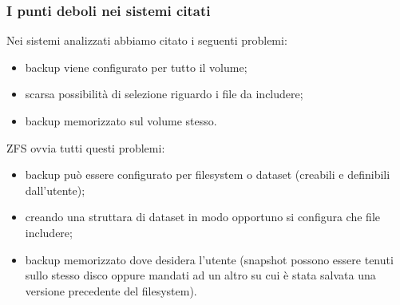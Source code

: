 \documentclass{beamer}
\begin{document}
\begin{frame}
\frametitle{I punti deboli nei sistemi citati}
Nei sistemi analizzati abbiamo citato i seguenti problemi:
\begin{itemize}
\item backup viene configurato per tutto il volume;
\item scarsa possibilit\`a di selezione riguardo i file da includere;
\item backup memorizzato sul volume stesso.
\end{itemize}
\end{frame}

\begin{frame}
ZFS ovvia tutti questi problemi: 
\begin{itemize}
\item backup pu\`o essere configurato per filesystem o dataset (creabili e definibili dall'utente);
\item creando una struttara di dataset in modo opportuno si configura che file includere;
\item backup memorizzato dove desidera l'utente (snapshot possono essere tenuti sullo stesso disco oppure mandati ad un altro su cui \`e stata salvata una versione precedente del filesystem).
\end{itemize}
\end{frame}
\end{document}
